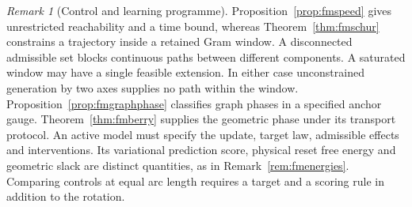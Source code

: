 \documentclass[aps,pra,onecolumn,superscriptaddress,nofootinbib,10pt]{revtex4-2}
\theoremstyle{definition}
\theoremstyle{remark}
\newtheorem{remark}[theorem]{Remark}
\begin{document}
\begin{remark}[Control and learning programme]\label{ob:controlprogramme}
Proposition~\ref{prop:fmspeed} gives unrestricted reachability and a
time bound, whereas Theorem~\ref{thm:fmschur} constrains a trajectory
inside a retained Gram window. A disconnected admissible set blocks
continuous paths between different components. A saturated window may
have a single feasible extension. In either case unconstrained
generation by two axes supplies no path within the window.
Proposition~\ref{prop:fmgraphphase} classifies graph phases in a
specified anchor gauge. Theorem~\ref{thm:fmberry} supplies the
geometric phase under its transport protocol. An active model must
specify the update, target law, admissible effects and interventions.
Its variational prediction score, physical reset free energy and
geometric slack are distinct quantities, as in
Remark~\ref{rem:fmenergies}. Comparing controls at equal arc length
requires a target and a scoring rule in addition to the rotation.
\end{remark}
\end{document}
